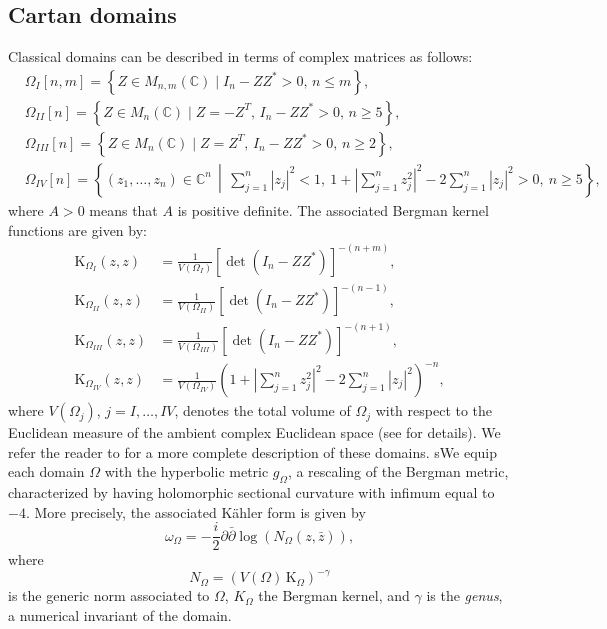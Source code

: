 \documentclass[reqno, 11pt]{amsart}
\begin{document}
\subsection{Cartan domains}
Classical domains can be described in terms of complex matrices as follows:
$$
\begin{aligned}
& \Omega_I[n, m] = \left\{ Z \in M_{n, m}(\mathbb{C}) \mid I_n - Z Z^* > 0, \, n \leq m \right\}, \\
& \Omega_{II}[n] = \left\{ Z \in M_n(\mathbb{C}) \mid Z = -Z^T,\, I_n - Z Z^* > 0, \, n \geq 5 \right\}, \\
& \Omega_{III}[n] = \left\{ Z \in M_n(\mathbb{C}) \mid Z = Z^T,\, I_n - Z Z^* > 0, \, n \geq 2 \right\}, \\
& \Omega_{IV}[n] = \left\{ (z_1, \ldots, z_n) \in \mathbb{C}^n \,\middle|\, \sum_{j=1}^n |z_j|^2 < 1,\ 1 + \left| \sum_{j=1}^n z_j^2 \right|^2 - 2 \sum_{j=1}^n |z_j|^2 > 0,\ n \geq 5 \right\},
\end{aligned}
$$
where \( A > 0 \) means that \( A \) is positive definite.
The associated Bergman kernel functions are given by:
$$
\begin{aligned}
\mathrm{K}_{\Omega_I}(z, z) &= \frac{1}{V(\Omega_I)} \left[ \det(I_n - Z Z^*) \right]^{-(n + m)}, \\
\mathrm{K}_{\Omega_{II}}(z, z) &= \frac{1}{V(\Omega_{II})} \left[ \det(I_n - Z Z^*) \right]^{-(n - 1)}, \\
\mathrm{K}_{\Omega_{III}}(z, z) &= \frac{1}{V(\Omega_{III})} \left[ \det(I_n - Z Z^*) \right]^{-(n + 1)}, \\
\mathrm{K}_{\Omega_{IV}}(z, z) &= \frac{1}{V(\Omega_{IV})} \left( 1 + \left| \sum_{j=1}^n z_j^2 \right|^2 - 2 \sum_{j=1}^n |z_j|^2 \right)^{-n},
\end{aligned}
$$
where \( V(\Omega_j) \), \( j = I, \ldots, IV \), denotes the total volume of \( \Omega_j\) with respect to the Euclidean measure of the ambient complex Euclidean space (see \cite{DISCALALOI2007KmapHSSintoCP} for details). We refer the reader to \cite{WANGYINZHANGROSS2006KEonHartogs} for a more complete description of these domains.
sWe equip each domain \( \Omega \) with the hyperbolic metric \( g_{\Omega} \), a rescaling of the Bergman metric, characterized by having holomorphic sectional curvature with infimum equal to \(-4\). More precisely, the associated Kähler form is given by
$$
\omega_{\Omega} = -\frac{i}{2} \partial \bar{\partial} \log\left( N_{\Omega}(z, \bar{z}) \right),
$$
where
$$
N_{\Omega} = \left( V(\Omega)\, \mathrm{K}_{\Omega} \right)^{-\gamma}
$$
is the generic norm associated to \( \Omega \), $K_\Omega$ the Bergman kernel, and \( \gamma \) is the \emph{genus}, a numerical invariant of the domain.
\end{document}
